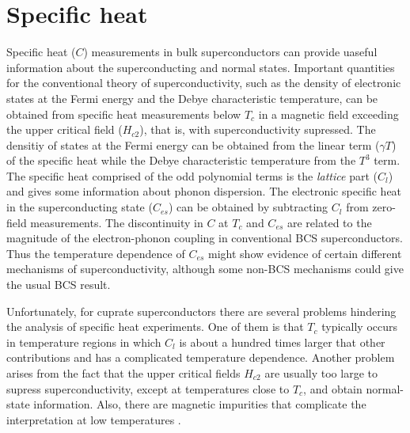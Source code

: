 \section{Specific heat}
\label{sec:specific_heat}

Specific heat ($C$) measurements in bulk superconductors can provide uaseful information about the superconducting and normal states.
Important quantities for the conventional theory of superconductivity, such as the density of electronic states at the Fermi energy and the Debye characteristic temperature, can be obtained from specific heat measurements below $T_c$ in a magnetic field exceeding the upper critical field ($H_{c2}$), that is, with superconductivity supressed.
The densitiy of states at the Fermi energy can be obtained from the linear term ($\gamma T$) of the specific heat while the Debye characteristic temperature from the $T^3$ term.
The specific heat comprised of the odd polynomial terms is the \textit{lattice} part ($C_l$) and gives some information about phonon dispersion. 
The electronic specific heat in the superconducting state  ($C_{es}$) can be obtained by subtracting $C_l$ from zero-field measurements.
The discontinuity in $C$ at $T_c$ and $C_{es}$ are related to the magnitude of the electron-phonon coupling in conventional BCS superconductors.
Thus the temperature dependence of $C_{es}$ might show evidence of certain different mechanisms of superconductivity, although some non-BCS mechanisms could give the usual BCS result.

Unfortunately, for cuprate superconductors there are several problems hindering the analysis of specific heat experiments.
One of them is that $T_c$ typically occurs in temperature regions in which $C_l$ is about a hundred times larger that other contributions and has a complicated temperature dependence.
Another problem arises from the fact that the upper critical fields $H_{c2}$ are usually too large to supress superconductivity, except at temperatures close to $T_c$, and obtain normal-state information.
Also, there are magnetic impurities that complicate the interpretation at low temperatures \cite{Fisher1988}.

